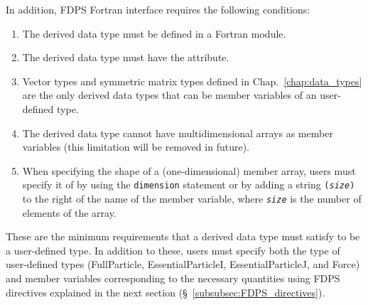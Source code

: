 In addition, FDPS Fortran interface requires the following conditions:
\begin{enumerate}[leftmargin=*,itemsep=-1ex,label=(\arabic*),resume]
\item The derived data type must be defined in a Fortran module.
\item The derived data type must have the  attribute.
\item Vector types and symmetric matrix types defined in Chap.~\ref{chap:data_types} are the only derived data types that can be member variables of an user-defined type.
\item The derived data type cannot have multidimensional arrays as member variables (this limitation will be removed in future).
\item When specifying the shape of a (one-dimensional) member array, users must specify it  of by using the \texttt{dimension} statement or by adding a string \texttt{(\textit{size})} to the right of the name of the member variable, where \textit{\texttt{size}} is the number of elements of the array.
\end{enumerate}

These are the minimum requirements that a derived data type must satisfy to be a user-defined type. In addition to these, users must specify both the type of user-defined types (FullParticle, EssentialParticleI, EssentialParticleJ, and Force) and member variables corresponding to the necessary quantities using FDPS directives explained in the next section (\S~\ref{subsubsec:FDPS_directives}). 

